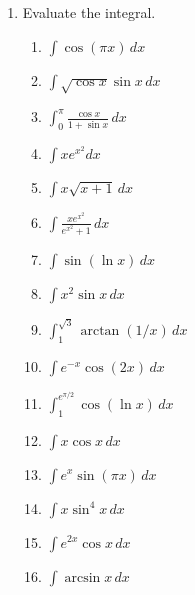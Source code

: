 \documentclass[letterpaper]{article}
\begin{document}
\begin{enumerate}

\item Evaluate the integral.
	\begin{enumerate}

	\item $\int \cos (\pi x) \,dx$

	\item $\int \sqrt{\cos x}\sin x\, dx$

	\item $\int_0^\pi \frac{\cos x}{1+\sin x}\,dx$ 

	\item $\int xe^{x^2} dx$

	\item $\int x \sqrt{x+1}\, dx$

	\item $\int \frac{x e^{x^2}}{e^{x^2}+1}\, dx$

	\item $\int \sin(\ln x)\, dx$

	\item $\int x^2\sin x\,dx$

	\item $\int_1^{\sqrt{3}} \arctan(1/x)\,dx$

	\item $\int e^{-x} \cos(2x)\, dx$

	\item $\int_1^{e^{\pi/2}} \cos (\ln x)\,dx$

	\item $\int x\cos x\,dx$

	\item $\int e^x \sin (\pi x)\,dx$

	\item $\int x \sin^4 x\,dx$

	\item $\int e^{2x} \cos x \,dx$

	\item $\int \arcsin x \, dx$


\end{enumerate}
\end{enumerate}
\end{document}
